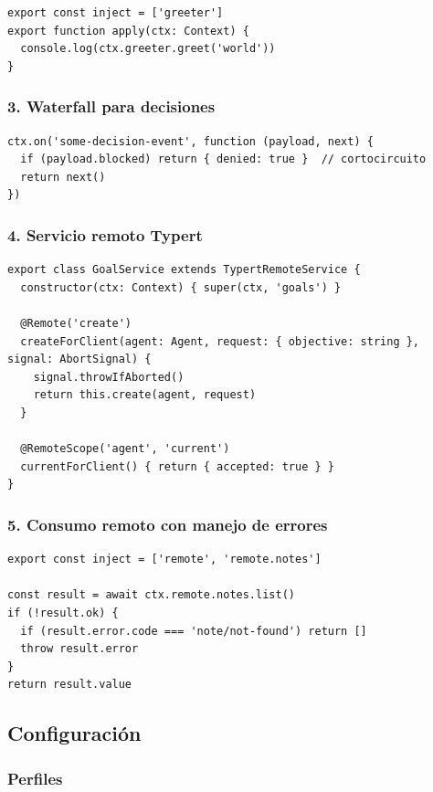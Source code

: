 \documentclass[11pt,a4paper]{article}
\begin{document}
\begin{lstlisting}
export const inject = ['greeter']
export function apply(ctx: Context) {
  console.log(ctx.greeter.greet('world'))
}
\end{lstlisting}


\subsubsection*{3. Waterfall para decisiones}


\begin{lstlisting}
ctx.on('some-decision-event', function (payload, next) {
  if (payload.blocked) return { denied: true }  // cortocircuito
  return next()
})
\end{lstlisting}


\subsubsection*{4. Servicio remoto Typert}


\begin{lstlisting}
export class GoalService extends TypertRemoteService {
  constructor(ctx: Context) { super(ctx, 'goals') }

  @Remote('create')
  createForClient(agent: Agent, request: { objective: string }, signal: AbortSignal) {
    signal.throwIfAborted()
    return this.create(agent, request)
  }

  @RemoteScope('agent', 'current')
  currentForClient() { return { accepted: true } }
}
\end{lstlisting}


\subsubsection*{5. Consumo remoto con manejo de errores}


\begin{lstlisting}
export const inject = ['remote', 'remote.notes']

const result = await ctx.remote.notes.list()
if (!result.ok) {
  if (result.error.code === 'note/not-found') return []
  throw result.error
}
return result.value
\end{lstlisting}


\subsection*{Configuración}


\subsubsection*{Perfiles}
\end{document}
